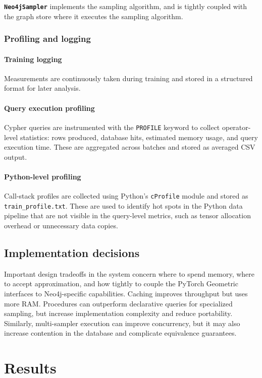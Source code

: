\documentclass[PhD]{uclathes}
\begin{document}
\noindent \textbf{\texttt{Neo4jSampler}} implements the sampling algorithm,
and is tightly coupled with the graph store where it executes the sampling
algorithm.

\subsection{Profiling and logging}
\subsubsection{Training logging}
Measurements are continuously taken during training and stored in a structured
format for later analysis.

\subsubsection{Query execution profiling}\label{sec:query_profiling}
Cypher queries are instrumented with the \texttt{PROFILE} keyword to collect
operator-level statistics: rows produced, database hits, estimated memory
usage, and query execution time. These are aggregated across batches and stored
as averaged CSV output.

\subsubsection{Python-level profiling}\label{sec:python_profiling}
Call-stack profiles are collected using Python's \texttt{cProfile} module and
stored as \texttt{train\_profile.txt}. These are used to identify hot spots in
the Python data pipeline that are not visible in the query-level metrics, such
as tensor allocation overhead or unnecessary data copies.

\section{Implementation decisions}
Important design tradeoffs in the system concern where to spend memory, where
to accept approximation, and how tightly to couple the PyTorch Geometric
interfaces to Neo4j-specific capabilities. Caching improves throughput but uses
more RAM. Procedures can outperform declarative queries for specialized
sampling, but increase implementation complexity and reduce portability.
Similarly, multi-sampler execution can improve concurrency, but it may also
increase contention in the database and complicate equivalence guarantees.

\chapter{Results}
\end{document}
